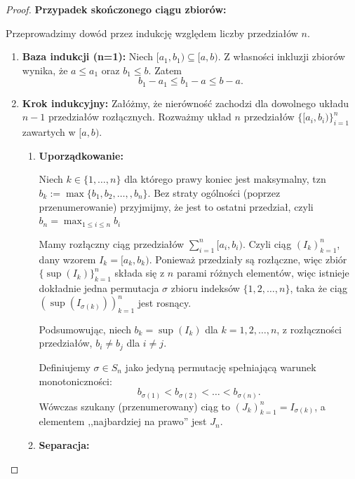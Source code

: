 \begin{proof}
	\textbf{Przypadek skończonego ciągu zbiorów:} 

	Przeprowadzimy dowód przez indukcję względem liczby przedziałów $n$.
	\begin{enumerate}[label=\arabic*.]
		\item \textbf{Baza indukcji (n=1):} Niech $[a_1,b_1) \subseteq [a,b)$. Z własności inkluzji zbiorów wynika, że $a\le a_1$ oraz $b_1\le b$. Zatem
			\[
			b_1-a_1 \le  b_1 - a \le b-a
			.\] 
		\item \textbf{Krok indukcyjny:} Załóżmy, że nierówność zachodzi dla dowolnego układu $n-1$ przedziałów rozłącznych. Rozważmy układ $n$ przedziałów $\{[a_{i}, b_{i})\}_{i=1}^{n} $ zawartych w $[a,b)$.
			\begin{enumerate}[label=\theenumi\arabic*., ref=\theenumi.\arabic*]
				\item \textbf{Uporządkowanie:}

					Niech $k\in \{1,\ldots,n\} $ dla którego prawy koniec jest maksymalny, tzn $b_{k} := \max\{b_1,b_2,\ldots,, b_{n}\} $. Bez straty ogólności (poprzez przenumerowanie) przyjmijmy, że jest to ostatni przedział, czyli $b_{n}= \max_{1\le i\le n}b_{i}$
					\begin{remark} Mamy rozłączny ciąg przedziałów $\sum_{i=1}^{n} [a_{i}, b_{i})$. Czyli ciąg $\left( I_{k} \right)_{k=1}^{n}$, dany wzorem $I_{k} = [a_{k}, b_{k})$. Ponieważ przedziały są rozłączne, więc zbiór $\{\sup ( I_{k} ) \}_{k=1}^{n}$ składa się z $n$ parami różnych elementów, więc istnieje dokładnie jedna permutacja $\sigma$ zbioru indeksów $\{1,2,\ldots, n\} $, taka że ciąg $( \sup ( I_{\sigma ( k ) }) )_{k=1}^{n}$ jest rosnący.

						Podsumowując, niech $b_{k} = \sup \left( I_{k} \right) $ dla $k=1,2,\ldots,n$, z rozłączności przedziałów, $b_{i}\neq b_{j}$ dla $i\neq j$.

						Definiujemy $\sigma \in S_{n}$ jako jedyną permutację spełniającą warunek monotoniczności:
						\[
						b_{\sigma\left( 1 \right) }<b_{\sigma\left( 2 \right) }<\ldots< b_{\sigma\left( n \right) }
						.\] 
						Wówczas szukany (przenumerowany) ciąg to $\left( J_{k} \right)_{k=1}^{n} = I_{\sigma(k)}$, a elementem ,,najbardziej na prawo'' jest $J_{n}$.
					\end{remark} 
				\item \textbf{Separacja:} 


\end{enumerate}
\end{enumerate}
\end{proof}
